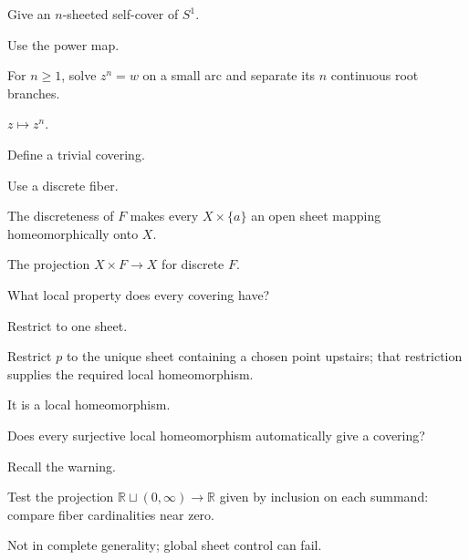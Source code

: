 \begin{exercise}\label{exr:viii10-09}
Give an \(n\)-sheeted self-cover of \(S^1\).
\end{exercise}
\begin{hint}
Use the power map.

For \(n\ge1\), solve \(z^n=w\) on a small arc and separate its \(n\) continuous root branches.
\end{hint}
\begin{solution}
\(z\mapsto z^n\).
\end{solution}

\begin{exercise}\label{exr:viii10-10}
Define a trivial covering.
\end{exercise}
\begin{hint}
Use a discrete fiber.

The discreteness of \(F\) makes every \(X\times\{a\}\) an open sheet mapping homeomorphically onto \(X\).
\end{hint}
\begin{solution}
The projection \(X\times F\to X\) for discrete \(F\).
\end{solution}

\begin{exercise}\label{exr:viii10-11}
What local property does every covering have?
\end{exercise}
\begin{hint}
Restrict to one sheet.

Restrict \(p\) to the unique sheet containing a chosen point upstairs; that restriction supplies the required local homeomorphism.
\end{hint}
\begin{solution}
It is a local homeomorphism.
\end{solution}

\begin{exercise}\label{exr:viii10-12}
Does every surjective local homeomorphism automatically give a covering?
\end{exercise}
\begin{hint}
Recall the warning.

Test the projection \(\mathbb R\sqcup(0,\infty)\to\mathbb R\) given by inclusion on each summand: compare fiber cardinalities near zero.
\end{hint}
\begin{solution}
Not in complete generality; global sheet control can fail.
\end{solution}

